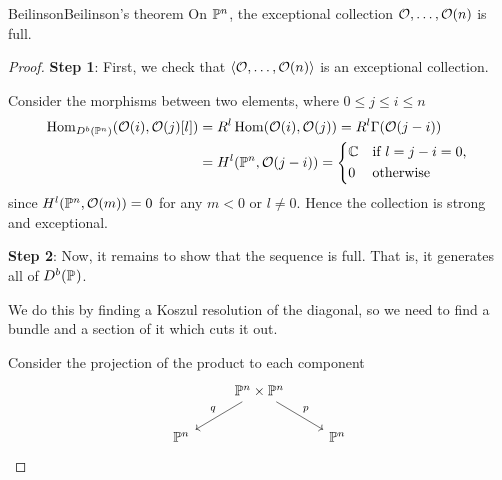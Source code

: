 \begin{theorem}{Beilinson}{Beilinson's theorem}
    On $\P^n$, the exceptional collection $\O,\dots,\O(n)$ is full.
\end{theorem}

\begin{proof}
    \textbf{Step 1}:
    First, we check that $\langle\O,\dots,\O(n)\rangle$ is an exceptional collection.

    Consider the morphisms between two elements, where $0\leq j\leq i \leq n$
    \begin{align*}
        \Hom_{D^b(\P^n)}(\O(i),\O(j)[l])
            &= R^l\Hom(\O(i),\O(j))
            = R^l\Gamma(\O(j-i)) \\
            &= H^l(\P^n,\O(j-i))
            = \begin{cases*}
                \C & if $l=j-i=0$, \\
                0 & otherwise
            \end{cases*}
    \end{align*}
    since $H^{l}(\P^n,\O(m))=0$ for any $m<0$ or $l \neq 0$. Hence the collection is strong and exceptional.

    \textbf{Step 2}: 
    Now, it remains to show that the sequence is full. That is, it generates all of $D^b(\P^{})$. 
    
    We do this by finding a Koszul resolution of the diagonal, so we need to find a bundle and a section of it which cuts it out.
    
    Consider the projection of the product to each component
    \begin{equation*}
        \begin{tikzcd}
            & \P^n\times\P^n \ar[dl,"q"'] \ar[dr,"p"] \\
            \P^n & & \P^n
        \end{tikzcd}
    \end{equation*}


\end{proof}
